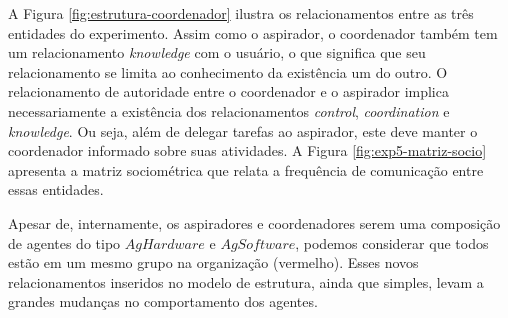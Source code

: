 \begin{figure}[h!]
    \centering
\end{figure}

A Figura \ref{fig:estrutura-coordenador} ilustra os relacionamentos entre as três entidades do experimento. Assim como o aspirador, o coordenador também tem um relacionamento \textit{knowledge} com o usuário, o que significa que seu relacionamento se limita ao conhecimento da existência um do outro. O relacionamento de autoridade entre o coordenador e o aspirador implica necessariamente a existência dos relacionamentos \textit{control}, \textit{coordination} e \textit{knowledge}. Ou seja, além de delegar tarefas ao aspirador, este deve manter o coordenador informado sobre suas atividades. A Figura \ref{fig:exp5-matriz-socio} apresenta a matriz sociométrica que relata a frequência de comunicação entre essas entidades. 

\begin{figure}[h!]
    \centering
\end{figure}

Apesar de, internamente, os aspiradores e coordenadores serem uma composição de agentes do tipo $AgHardware$ e $AgSoftware$, podemos considerar que todos estão em um mesmo grupo na organização (vermelho). Esses novos relacionamentos inseridos no modelo de estrutura, ainda que simples, levam a grandes mudanças no comportamento dos agentes.  

